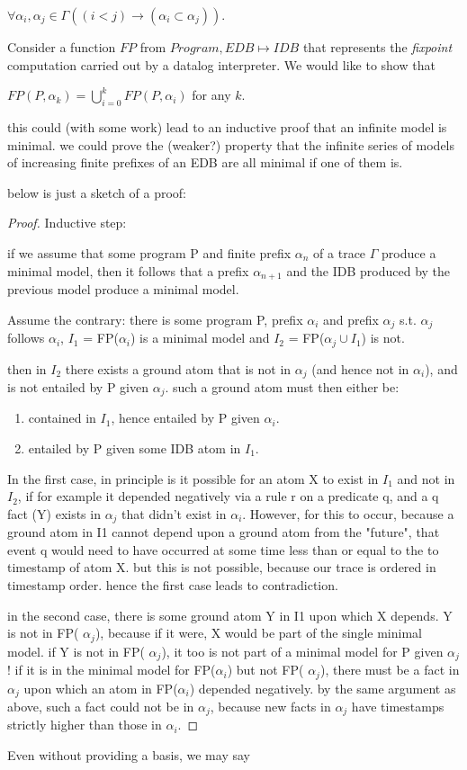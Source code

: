 $\forall \alpha_{i}, \alpha_{j} \in \Gamma ((i < j) \to (\alpha_{i} \subset \alpha_{j}))$.

Consider a function $FP$ from $Program, EDB \mapsto IDB$ that represents the \emph{fixpoint} computation carried out by a datalog interpreter.
We would like to show that 

$FP(P, \alpha_{k}) =  \displaystyle \bigcup_{i=0}^{k} FP(P, \alpha_{i})$ for any $k$.  

this could (with some work) lead to an inductive proof
that an infinite model is minimal.  we could prove the (weaker?) property that
the infinite series of models of increasing finite prefixes of an EDB are all 
minimal if one of them is.

below is just a sketch of a proof:

\begin{proof}

Inductive step:

if we assume that some program P and finite prefix $\alpha_n$ of a trace $\Gamma$ produce a minimal model, 
then it follows that a prefix $\alpha_{n+1}$ and the IDB produced by the previous model produce a minimal model.

Assume the contrary: there is some program P, prefix $\alpha_i$ and prefix $\alpha_j$  s.t. $\alpha_j$ follows $\alpha_i$, $I_1$ = FP($\alpha_i$) is a minimal model 
and $I_2$ = FP($\alpha_j \cup I_1$) is not.  

then in $I_2$ there exists a ground atom that is not in $\alpha_j$ (and hence not in $\alpha_i$), and is not entailed by P given $\alpha_j$.  
such a ground atom must then either be:

\begin{enumerate}
\item contained in $I_1$, hence entailed by P given $\alpha_i$.
\item entailed by P given some IDB atom in $I_1$.
\end{enumerate}

In the first case, in principle is it possible for an atom X to exist in $I_1$ and not in $I_2$, if for example it depended negatively via a 
rule r on a predicate q, and a q fact (Y) exists in  $\alpha_j$ that didn't exist in  $\alpha_i$.  However, for this to occur, because a ground atom 
in I1 cannot depend upon a ground atom from the "future", that event q would need to have occurred at some time less than 
or equal to the to timestamp of atom X.  but this is not possible, because our trace is ordered in timestamp order.  hence the 
first case leads to contradiction.

in the second case, there is some ground atom Y in I1 upon which X depends.  Y is not in FP( $\alpha_j$), because if it were, X would 
be part of the single minimal model.  if Y is not in FP( $\alpha_j$), it too is not part of a minimal model for P given  $\alpha_j$!  if it is in the minimal 
model for FP($\alpha_i$) but not FP( $\alpha_j$), there must be a fact in  $\alpha_j$ upon which an atom in FP($\alpha_i$) depended negatively.  by the same 
argument as above, such a fact could not be in  $\alpha_j$, because new facts in  $\alpha_j$ have timestamps strictly higher than those in  $\alpha_i$.
\end{proof}

Even without providing a basis, we may say